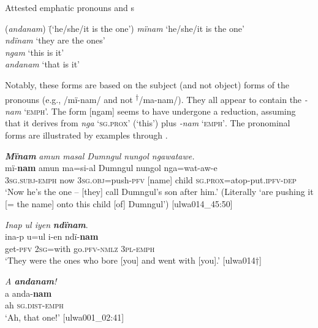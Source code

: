 \ea%
    \label{ex:pron:80a}
            Attested emphatic pronouns and s\\
\begin{tabbing}
{(\textit{andanam})} \= {(‘he/she/it is the one’)}\kill
{\textit{mïnam}} \> {‘he/she/it is the one’}\\
{\textit{ndïnam}} \> {‘they are the ones’}\\
{\textit{ngam}} \> {‘this is it’}\\
{\textit{andanam}} \> {‘that is it’}
\end{tabbing}
 \z

Notably, these forms are based on the subject (and not object) forms of the pronouns (e.g., /mï-nam/ and not \textsuperscript{†}/ma-nam/). They all appear to contain the   \textit{-nam} ‘\textsc{emph}’. The form [ngam] seems to have undergone a  reduction, assuming that it derives from \textit{nga} ‘\textsc{sg.prox}’ (‘this’) plus \textit{-nam} ‘\textsc{emph’}. The  pronominal forms are illustrated by examples  through .

\ea%
    \label{ex:pron:81}
          \textbf{\textit{Mïnam}} \textit{amun masal Dumngul nungol ngawatawe.}\\
\gll    mï-\textbf{nam}  amun  ma=si{}-al      Dumngul  nungol nga=wat-aw-e\\
    3\textsc{sg.subj-emph}  now  3\textsc{sg.obj}=push-\textsc{pfv}  [name]    child    \textsc{sg.prox}=atop-put.\textsc{ipfv-dep}\\
\glt `Now he’s the one -- [they] call Dumngul’s son after him.’ (Literally ‘are pushing it [= the name] onto this child [of] Dumngul’) [ulwa014\_45:50]
\z

\ea%
    \label{ex:pron:82}
         \textit{Inap ul iyen} \textbf{\textit{ndïnam}}.\\
\gll ina-p    u=ul    i-en      ndï-\textbf{nam}\\
    get-\textsc{pfv}  2\textsc{sg}=with  go.\textsc{pfv-nmlz}  3\textsc{pl-emph}\\
\glt `They were the ones who bore [you] and went with [you].’ [ulwa014†]
\z

\ea%
    \label{ex:pron:83}
          \textit{A \textbf{andanam}!}\\
\gll a  anda-\textbf{nam}\\
    ah  \textsc{sg.dist-emph}\\
\glt `Ah, that one!’ [ulwa001\_02:41]
\z

